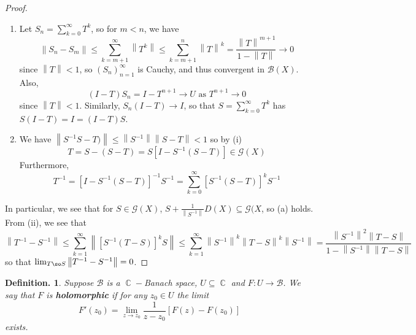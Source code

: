\documentclass[11pt, a4paper]{memoir}
\DeclareMathOperator{\C}{{\mathbb{C}}}
\newcommand{\norm}[1]{\ensuremath{\left\lVert#1\right\rVert}}
\theoremstyle{change}
\theoremstyle{plain}
\theoremstyle{nonumberplain}
\newtheorem{definition}{Definition.}
\newtheorem{proof}{Proof}
\numberwithin{equation}{section}
\begin{document}
\begin{proof}
    \begin{enumerate}[nl,r]
        \item Let $S_n=\sum_{k=0}^\infty T^k$, so for $m<n$, we have
            \begin{equation*}
                \norm{S_n-S_m}\leq\sum_{k=m+1}^\infty\norm{T^k}\leq\sum_{k=m+1}^n\norm{T}^k=\frac{\norm{T}^{m+1}}{1-\norm{T}}\to 0
            \end{equation*}
            since $\norm{T}<1$, so $(S_n)_{n=1}^\infty$ is Cauchy, and thus convergent in $\mathcal{B}(X)$.
            Also,
            \begin{equation*}
                (I-T)S_n=I-T^{n+1}\to U\text{ as }T^{n+1}\to 0
            \end{equation*}
            since $\norm{T}<1$.
            Similarly, $S_n(I-T)\to I$, so that $S=\sum_{k=0}^\infty T^k$ has $S(I-T)=I=(I-T)S$.
        \item We have $\norm{S^{-1}S-T)}\leq\norm{S^{-1}}\norm{S-T}<1$ so by (i)
            \begin{equation*}
                T=S-(S-T)=S[I-S^{-1}(S-T)]\in\mathcal{G}(X)
            \end{equation*}
            Furthermore,
            \begin{equation*}
                T^{-1}=[I-S^{-1}(S-T)]^{-1}S^{-1}=\sum_{k=0}^\infty[S^{-1}(S-T)]^kS^{-1}
            \end{equation*}
    \end{enumerate}
    In particular, we see that for $S\in\mathcal{G}(X)$, $S+\frac{1}{\norm{S^{-1}}}D(X)\subseteq\mathcal{G}(X$, so (a) holds.
    From (ii), we see that
    \begin{equation*}
        \norm{T^{-1}-S^{-1}}\leq\sum_{k=1}^\infty\norm{[S^{-1}(T-S)]^kS}\leq\sum_{k=1}^\infty\norm{S^{-1}}^k\norm{T-S}^k\norm{S^{-1}}=\frac{\norm{S^{-1}}^2\norm{T-S}}{1-\norm{S^{-1}}\norm{T-S}}
    \end{equation*}
    so that $\lim_{T\so S}\norm{T^{-1}-S^{-1}}=0$.
\end{proof}
\begin{definition}
    Suppose $\mathcal{B}$ is a $\C-$Banach space, $U\subseteq\C$ and $F:U\to\mathcal{B}$.
    We say that $F$ is \textbf{holomorphic} if for any $z_0\in U$ the limit
    \begin{equation*}
        F'(z_0)=\lim_{z\to z_0}\frac{1}{z-z_0}[F(z)-F(z_0)]
    \end{equation*}
    exists.
\end{definition}
\end{document}
